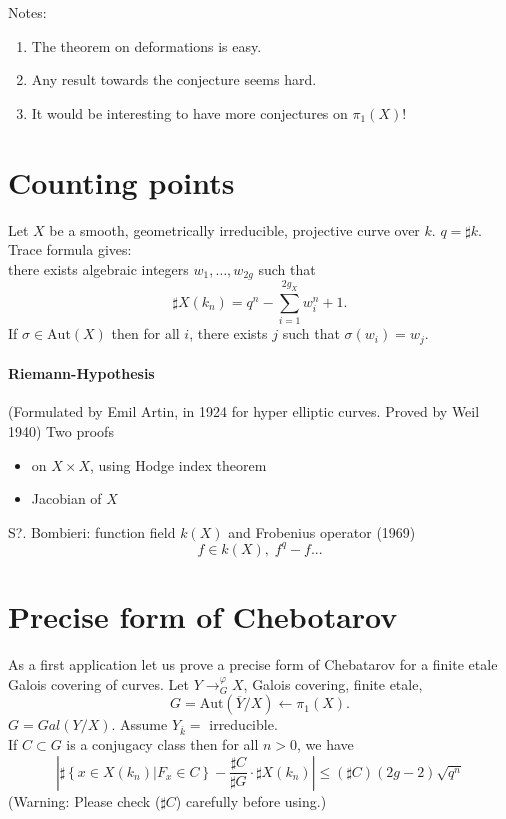 \medskip\noindent
Notes:
\begin{enumerate}
\item The theorem on deformations is easy.
\item Any result towards the conjecture seems hard.
\item It would be interesting to have more conjectures on $\pi_1(X)$!
\end{enumerate}




\section{Counting points}
\label{section-counting}

\noindent
Let $X$ be a smooth, geometrically irreducible, 
projective curve over $k$. $q=\sharp k$. Trace formula gives:\\
there exists algebraic integers $w_1, \ldots, w_{2g}$ such that 
	$$\sharp X(k_n) = q^n-\sum_{i=1}^{2g_X}w_i^n+1.$$
If $\sigma\in \text{Aut}(X)$ then for all $i$, there exists $j$ such that 
$\sigma(w_i)=w_j$. 

\paragraph{Riemann-Hypothesis} (Formulated by Emil Artin, in 1924 for hyper 
elliptic curves. Proved by Weil 1940) Two proofs
	\begin{itemize}
	\item on $X\times X$, using Hodge index theorem
	\item Jacobian of $X$
	\end{itemize}
S?. Bombieri: function field $k(X)$ and Frobenius operator (1969)
	$$f\in k(X), \; f^q-f...$$


\section{Precise form of Chebotarov}
\label{section-vhebotarov}

\noindent
As a first application let us prove a precise form of Chebatarov
for a finite etale Galois covering of curves.
Let $Y\to^\varphi_G X$, Galois covering, finite etale, 
	$$G = \text{Aut}(\overline Y/X) \leftarrow \pi_1(X).$$
	$G=Gal(Y/X)$. 
	Assume $Y_{\overline k} = $ irreducible. \\
If $C\subset G$ is a conjugacy class then for all $n>0$, we have
	$$\left|\sharp\left\{x\in X(k_n)\left|F_x\in 
C\right.\right\}-\frac{\sharp C}{\sharp G}\cdot\sharp X(k_n)\right|\leq (\sharp 
C)(2g-2)\sqrt{q^n}$$
	(Warning: Please check ($\sharp C$) carefully before using.)\\
	
